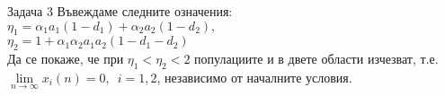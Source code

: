 \begin{frame}[t]{Задача 3}
  Въвеждаме следните означения:\\
  $\eta_{1} = \alpha_{1} a_{1} (1-d_{1}) + \alpha_{2} a_{2} (1-d_{2}),$ \\
  $\eta_{2} = 1 + \alpha_{1} \alpha_{2} a_{1} a_{2} (1 - d_{1} - d_{2})$ \\
  Да се покаже, че при $\eta_{1} < \eta_{2} < 2$ популациите и в двете области изчезват, т.е. $\lim\limits_{n \to \infty}x_{i}(n)=0, \enspace i=1,2$, независимо от началните условия.
\end{frame}
